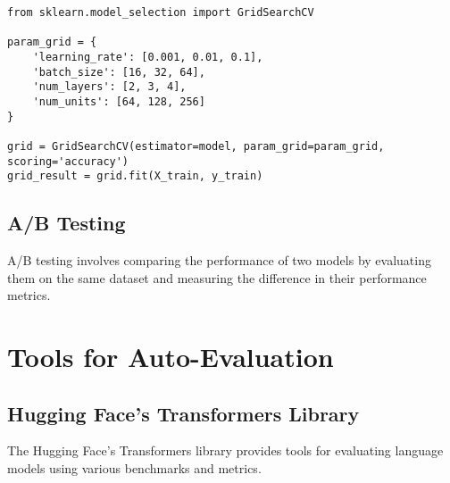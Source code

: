 \begin{verbatim}
from sklearn.model_selection import GridSearchCV

param_grid = {
    'learning_rate': [0.001, 0.01, 0.1],
    'batch_size': [16, 32, 64],
    'num_layers': [2, 3, 4],
    'num_units': [64, 128, 256]
}

grid = GridSearchCV(estimator=model, param_grid=param_grid, scoring='accuracy')
grid_result = grid.fit(X_train, y_train)
\end{verbatim}

\subsection{A/B Testing}
A/B testing involves comparing the performance of two models by evaluating them on the same dataset and measuring the difference in their performance metrics.

\section{Tools for Auto-Evaluation}

\subsection{Hugging Face's Transformers Library}
The Hugging Face's Transformers library provides tools for evaluating language models using various benchmarks and metrics.

